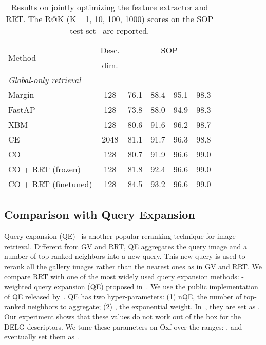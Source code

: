\begin{table}[t]
\setlength{\tabcolsep}{1.5pt}
    \begin{tabular}{lccccc}
    \toprule
    \multirow{2}{*}{Method} & Desc. & \multicolumn{4}{c}{SOP} \\ 
& dim. &  &  &  &  \\
    \midrule
    { \textit{Global-only retrieval}} \\
    Margin~\cite{margin2017,roth2020revisiting}  & 128 & 76.1 & 88.4 & 95.1 & 98.3\\
FastAP~\cite{fastap2019}  & 128 & 73.8 & 88.0 & 94.9 & 98.3\\
    XBM~\cite{XBM2020}  & 128 & 80.6 & 91.6 & 96.2 & 98.7 \\
    CE~\cite{CE2020} & 2048 & 81.1 & 91.7 & 96.3 & 98.8 \\
    \midrule
CO & 128 & 80.7 & 91.9 & \num[math-rm=\mathbf]{96.6} & \num[math-rm=\mathbf]{99.0}\\
    CO + RRT (frozen) & 128 & 81.8 & 92.4 & \num[math-rm=\mathbf]{96.6} &\num[math-rm=\mathbf]{99.0}  \\
    CO + RRT (finetuned)& 128 & \num[math-rm=\mathbf]{84.5} & \num[math-rm=\mathbf]{93.2} & \num[math-rm=\mathbf]{96.6} &\num[math-rm=\mathbf]{99.0}\\
    \bottomrule
    
    \end{tabular}
\vspace{-0.5em}
\caption{Results on jointly optimizing the feature extractor and RRT. The R@K (K =1, 10, 100, 1000) scores on the SOP test set~\cite{sop2016} are reported.
\vspace{-0.14in}
}
\label{tab:sop}
\end{table}

\subsection{Comparison with Query Expansion}

Query expansion (QE)~\cite{qe2007, qe2011, qe2014} is another popular reranking technique for image retrieval. 
Different from GV and RRT, QE aggregates the query image and a number of top-ranked neighbors into a new query.
This new query is used to rerank all the gallery images rather than the nearest ones as in GV and RRT.
We compare RRT with one of the most widely used query expansion methods: -weighted query expansion (QE) proposed in~\cite{finetune2016}.
We use the public implementation of QE
released by~\cite{listwise2019}.
QE has two hyper-parameters: (1) nQE, the number of top-ranked neighbors to aggregate; (2) , the exponential weight.
In~\cite{listwise2019}, they are set as .
Our experiment shows that these values do not work out of the box for the DELG descriptors.
We tune these parameters on Oxf over the ranges: , and eventually set them as .

